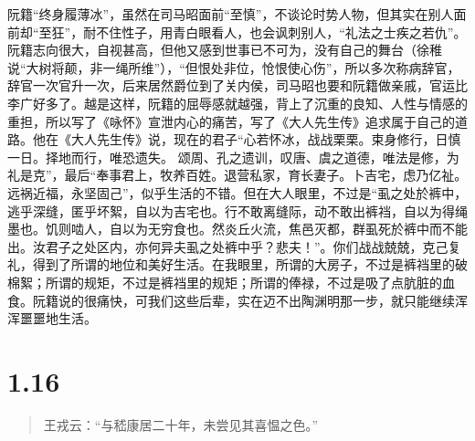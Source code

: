 \documentclass[]{book}
\begin{document}
阮籍``终身履薄冰''，虽然在司马昭面前``至慎''，不谈论时势人物，但其实在别人面前却``至狂''，耐不住性子，用青白眼看人，也会讽刺别人，``礼法之士疾之若仇''。阮籍志向很大，自视甚高，但他又感到世事已不可为，没有自己的舞台（徐稚说``大树将颠，非一绳所维''），``但恨处非位，怆恨使心伤''，所以多次称病辞官，辞官一次官升一次，后来居然爵位到了关内侯，司马昭也要和阮籍做亲戚，官运比李广好多了。越是这样，阮籍的屈辱感就越强，背上了沉重的良知、人性与情感的重担，所以写了《咏怀》宣泄内心的痛苦，写了《大人先生传》追求属于自己的道路。他在《大人先生传》说，现在的君子``心若怀冰，战战栗栗。束身修行，日慎一日。择地而行，唯恐遗失。
颂周、孔之遗训，叹唐、虞之道德，唯法是修，为礼是克''，最后``奉事君上，牧养百姓。退营私家，育长妻子。卜吉宅，虑乃亿祉。远祸近福，永坚固己''，似乎生活的不错。但在大人眼里，不过是``虱之处於裤中，逃乎深缝，匿乎坏絮，自以为吉宅也。行不敢离缝际，动不敢出裤裆，自以为得绳墨也。饥则啮人，自以为无穷食也。然炎丘火流，焦邑灭都，群虱死於裤中而不能出。汝君子之处区内，亦何异夫虱之处裤中乎？悲夫！''。你们战战兢兢，克己复礼，得到了所谓的地位和美好生活。在我眼里，所谓的大房子，不过是裤裆里的破棉絮；所谓的规矩，不过是裤裆里的规矩；所谓的俸禄，不过是吸了点肮脏的血食。阮籍说的很痛快，可我们这些后辈，实在迈不出陶渊明那一步，就只能继续浑浑噩噩地生活。

\section{1.16}\label{section-15}

\begin{quote}
王戎云：``与嵇康居二十年，未尝见其喜愠之色。''
\end{quote}
\end{document}
